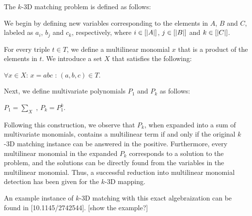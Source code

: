 The $k$-3D matching problem is defined as follows:

\begin{problem}
\end{problem}

We begin by defining new variables corresponding to the elements in $A$, $B$ and $C$, 
labeled as $a_i$, $b_j$ and $c_k$, respectively, where $i\in [{\left\vert A\right\vert}]$, $j\in [{\left\vert B\right\vert}]$ and $k\in [{\left\vert C\right\vert}]$. 

For every triple $t \in T$, we define a multilinear monomial $x$ that is a product of the elements in $t$. 
We introduce a set $X$ that satisfies the following:
\begin{center}$\forall x \in X$: $x = abc$ : $(a, b, c) \in T$.\end{center}

Next, we define multivariate polynomials $P_1$ and $P_k$ as follows:
\begin{center}$P_1 = \displaystyle \sum_{X}$ ,   $P_k = P_1^k$.\end{center}

Following this construction, we observe that $P_k$, when expanded into a sum of multivariate monomials, 
contains a multilinear term if and only if the original $k$-3D matching instance can be answered in the positive. 
Furthermore, every multilinear monomial in the expanded $P_k$ corresponds to a solution to the problem, and 
the solutions can be directly found from the variables in the multilinear monomial. Thus, 
a successful reduction into multilinear monomial detection has been given for the $k$-3D mapping.\nl

An example instance of $k$-3D matching with this exact algebraization can be found in [10.1145/2742544]. [show the example?]\nl




